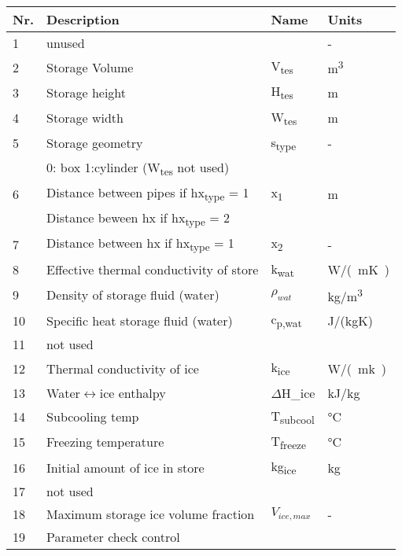 \documentclass[english]{SPFReport}
\begin{document}
\def\arraystretch{1.3}
\begin{tabular}{| l |  m{8cm} | l | l |}


\hline
\textbf{Nr.} & \textbf{Description} & \textbf{Name}& \textbf{Units} \\
\hline

 1 & unused &  & -  \\
  2 & Storage Volume & \si{V_{tes}} & \si{m^3}  \\
  3 & Storage height & \si{H_{tes}} & m  \\
  4 & Storage width & \si{W_{tes}} & m  \\
  5 & Storage geometry & \si{s_{type}} & - \\    
     &   0: box 1:cylinder (\si{W_{tes}} not used) &&\\
  6 & Distance between pipes if \si{hx_{type}} = 1 & \si{x_1} & m \\
     & Distance beween hx if \si{hx_{type}} = 2 & & \\
  7 & Distance between hx if \si{hx_{type}} = 1 & \si{x_2} & -  \\
  8 & Effective thermal conductivity of store & \si{k_{wat}} & \si{W/(mK)}  \\
  9 & Density of storage fluid (water) & \si{$\rho_{wat}$} & \si{kg/m^3}  \\
  10 & Specific heat storage fluid (water) & \si{c_{p,wat}} & J/(kgK) \\
11 &not used &  &  \\
  12 & Thermal conductivity of ice & \si{k_{ice}} & \si{W/(mk)}  \\
  13 & Water$\leftrightarrow$ice enthalpy & \si{$\Delta$H_{ice}} &        \si{kJ/kg}  \\
  14 & Subcooling temp & \si{T_{subcool}} & \si{\degreeCelsius} \\
  15 & Freezing temperature & \si{T_{freeze}} &\si{\degreeCelsius} \\
  16 & Initial amount of ice in store & \si{kg_{ice}} & kg \\
17 & not used & & \\
  18 & Maximum storage ice volume fraction & \si{$V_{ice,max}$} & - \\
  19 & Parameter check control &&\\

\end{tabular}
\end{document}
